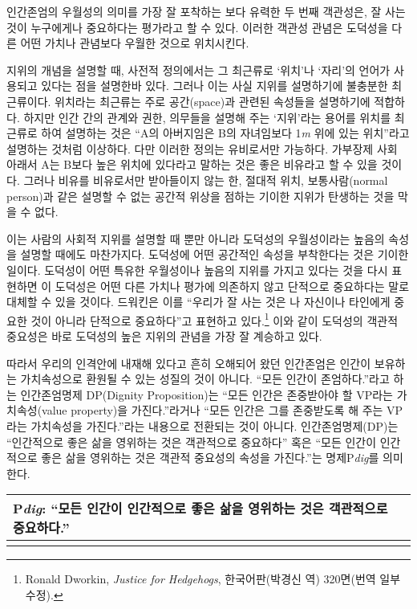 인간존엄의 우월성의 의미를 가장 잘 포착하는 보다 유력한 두 번째 객관성은, 잘 사는 것이 누구에게나 중요하다는 평가라고 할 수 있다. 이러한 객관성 관념은 도덕성을 다른 어떤 가치나 관념보다 우월한 것으로 위치시킨다.

지위의 개념을 설명할 때, 사전적 정의에서는 그 최근류로 `위치'나 `자리'의 언어가 사용되고 있다는 점을 설명한바 있다. 그러나 이는 사실 지위를 설명하기에 불충분한 최근류이다. 위치라는 최근류는 주로 공간(space)과 관련된 속성들을 설명하기에 적합하다. 하지만 인간 간의 관계와 권한, 의무들을 설명해 주는 `지위'라는 용어를 위치를 최근류로 하여 설명하는 것은 ``A의 아버지임은 B의 자녀임보다 1\emph{m} 위에 있는 위치''라고 설명하는 것처럼 이상하다. 다만 이러한 정의는 유비로서만 가능하다. 가부장제 사회 아래서 A는 B보다 높은 위치에 있다라고 말하는 것은 좋은 비유라고 할 수 있을 것이다. 그러나 비유를 비유로서만 받아들이지 않는 한, 절대적 위치, 보통사람(normal person)과 같은 설명할 수 없는 공간적 위상을 점하는 기이한 지위가 탄생하는 것을 막을 수 없다.

이는 사람의 사회적 지위를 설명할 때 뿐만 아니라 도덕성의 우월성이라는 높음의 속성을 설명할 때에도 마찬가지다. 도덕성에 어떤 공간적인 속성을 부착한다는 것은 기이한 일이다. 도덕성이 어떤 특유한 우월성이나 높음의 지위를 가지고 있다는 것을 다시 표현하면 이 도덕성은 어떤 다른 가치나 평가에 의존하지 않고 단적으로 중요하다는 말로 대체할 수 있을 것이다. 드워킨은 이를 ``우리가 잘 사는 것은 나 자신이나 타인에게 중요한 것이 아니라 단적으로 중요하다''고 표현하고 있다.\footnote{Ronald Dworkin, \emph{Justice for Hedgehogs}, 한국어판(박경신 역) 320면(번역 일부 수정).} 이와 같이 도덕성의 객관적 중요성은 바로 도덕성의 높은 지위의 관념을 가장 잘 계승하고 있다.

따라서 우리의 인격안에 내재해 있다고 흔히 오해되어 왔던 인간존엄은 인간이 보유하는 가치속성으로 환원될 수 있는 성질의 것이 아니다. ``모든 인간이 존엄하다.''라고 하는 인간존엄명제 DP(Dignity Proposition)는 ``모든 인간은 존중받아야 할 VP라는 가치속성(value property)을 가진다.''라거나 ``모든 인간은 그를 존중받도록 해 주는 VP라는 가치속성을 가진다.''라는 내용으로 전환되는 것이 아니다. 인간존엄명제(DP)는 ``인간적으로 좋은 삶을 영위하는 것은 객관적으로 중요하다'' 혹은 ``모든 인간이 인간적으로 좋은 삶을 영위하는 것은 객관적 중요성의 속성을 가진다.''는 명제P\emph{dig}를 의미한다.

\begin{longtable}[]{@{}
  >{\raggedright\arraybackslash}p{}@{}}
\toprule\noalign{}
\begin{minipage}[b]{\linewidth}\centering
\textbf{P\emph{dig}}: ``모든 인간이 인간적으로 좋은 삶을 영위하는 것은 객관적으로 중요하다.''
\end{minipage} \\
\midrule\noalign{}
\endhead
\bottomrule\noalign{}
\endlastfoot
\end{longtable}

